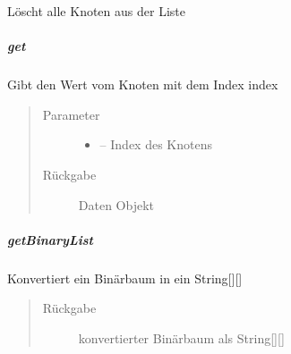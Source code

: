 \documentclass[letterpaper,10pt,ngerman]{sphinxmanual}
\begin{document}
\begin{fulllineitems}
\label{\detokenize{com/linuxluigi/edu/list/Listlabel:com.linuxluigi.edu.list.Listlabel.clearAll()}}
Löscht alle Knoten aus der Liste

\end{fulllineitems}



\subparagraph{get}
\label{\detokenize{com/linuxluigi/edu/list/Listlabel:get}}

\begin{fulllineitems}
\label{\detokenize{com/linuxluigi/edu/list/Listlabel:com.linuxluigi.edu.list.Listlabel.get(int)}}
Gibt den Wert vom Knoten mit dem Index index
\begin{quote}\begin{description}
\item[{Parameter}] \leavevmode\begin{itemize}
\item {} 
 -- Index des Knotens

\end{itemize}

\item[{Rückgabe}] \leavevmode
Daten Objekt

\end{description}\end{quote}

\end{fulllineitems}



\subparagraph{getBinaryList}
\label{\detokenize{com/linuxluigi/edu/list/Listlabel:getbinarylist}}

\begin{fulllineitems}
\label{\detokenize{com/linuxluigi/edu/list/Listlabel:com.linuxluigi.edu.list.Listlabel.getBinaryList()}}
Konvertiert ein Binärbaum in ein String{[}{]}{[}{]}
\begin{quote}\begin{description}
\item[{Rückgabe}] \leavevmode
konvertierter Binärbaum als String{[}{]}{[}{]}

\end{description}\end{quote}

\end{fulllineitems}
\end{document}
